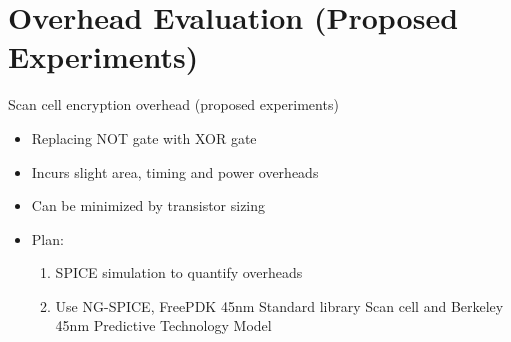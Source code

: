 \section{Overhead Evaluation (Proposed Experiments)}
\begin{frame}{Scan cell encryption overhead (proposed experiments) }
\begin{itemize}
\item Replacing NOT gate with XOR gate
\item Incurs slight area, timing and power overheads
\item Can be minimized by transistor sizing
\item \alert{Plan}:
\begin{enumerate}
	\item SPICE simulation to quantify overheads
	\item Use NG-SPICE, FreePDK 45nm Standard library Scan cell and Berkeley 45nm Predictive Technology Model
\end{enumerate}
\end{itemize}
\end{frame}
